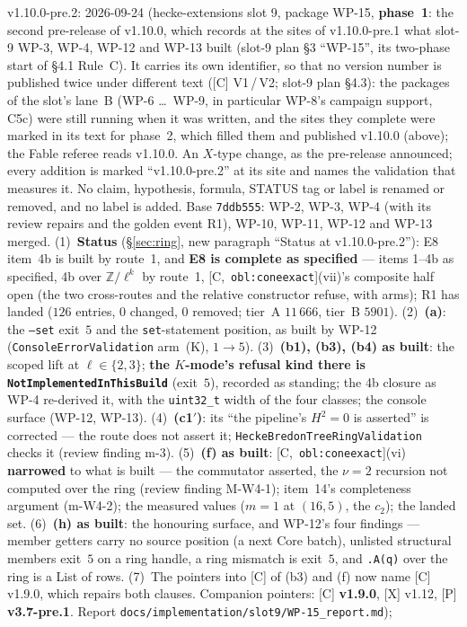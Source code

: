 \documentclass[11pt]{article}
\theoremstyle{remark}
\newcommand{\Z}{\mathbb{Z}}
\newcommand{\HA}[1]{[C,~\texttt{#1}]}      %
\begin{document}
v1.10.0-pre.2: 2026-09-24 (hecke-extensions slot 9, package WP-15,
\textbf{phase~1}: the second pre-release of v1.10.0, which records at the sites of
v1.10.0-pre.1 what slot-9 WP-3, WP-4, WP-12 and WP-13 built (slot-9 plan \S3 ``WP-15'', its
two-phase start of \S4.1 Rule~C). It carries its own identifier, so that no version number is
published twice under different text ([C] V1\,/\,V2; slot-9 plan \S4.3): the packages of the
slot's lane~B (WP-6 \ldots\ WP-9, in particular WP-8's campaign support, C5c) were still running
when it was written, and the sites they complete were marked in its text for phase~2, which
filled them and published v1.10.0 (above); the Fable referee reads
v1.10.0. An $X$-type change, as the pre-release announced; every addition is marked
``v1.10.0-pre.2'' at its site and names the validation that measures it. No claim, hypothesis,
formula, STATUS tag or label is renamed or removed, and no label is added. Base \texttt{7ddb555}:
WP-2, WP-3, WP-4 (with its review repairs and the golden event R1), WP-10, WP-11, WP-12 and WP-13
merged.
(1)~\textbf{Status} (\S\ref{sec:ring}, new paragraph ``Status at v1.10.0-pre.2''): E8 item~4b is
built by route~1, and \textbf{E8 is complete as specified} --- items 1--4b as specified, 4b over
$\Z/\ell^k$ by route~1, \HA{obl:coneexact}(vii)'s composite half open (the two cross-routes and
the relative constructor refuse, with arms); R1 has landed ($126$ entries, $0$ changed, $0$
removed; tier~A $11\,666$, tier~B $5901$).
(2)~\textbf{(a)}: the \texttt{--set} exit~$5$ and the \texttt{set}-statement position, as built
by WP-12 (\texttt{ConsoleErrorValidation} arm~(K), $1\to5$).
(3)~\textbf{(b1), (b3), (b4) as built}: the scoped lift at $\ell\in\{2,3\}$; \textbf{the $K$-mode's
refusal kind there is \texttt{NotImplementedInThisBuild}} (exit~$5$), recorded as standing; the
4b closure as WP-4 re-derived it, with the \texttt{uint32\_t} width of the four classes; the
console surface (WP-12, WP-13).
(4)~\textbf{(c1$'$)}: its ``the pipeline's $H^2=0$ is asserted'' is corrected --- the route does
not assert it; \texttt{HeckeBredonTreeRingValidation} checks it (review finding m-3).
(5)~\textbf{(f) as built}: \HA{obl:coneexact}(vi) \textbf{narrowed} to what is built --- the
commutator asserted, the $\nu=2$ recursion not computed over the ring (review finding M-W4-1);
item~14's completeness argument (m-W4-2); the measured values ($m=1$ at $(16,5)$, the $c_2$);
the landed set.
(6)~\textbf{(h) as built}: the honouring surface, and WP-12's four findings --- member getters
carry no source position (a next Core batch), unlisted structural members exit~$5$ on a ring
handle, a ring mismatch is exit~$5$, and \texttt{.A(q)} over the ring is a List of rows.
(7)~The pointers into [C] of (b3) and (f) now name [C] v1.9.0, which repairs both clauses.
Companion pointers: [C] \textbf{v1.9.0}, [X] v1.12, [P] \textbf{v3.7-pre.1}. Report
\texttt{docs/implementation/slot9/WP-15\_report.md});
\end{document}
